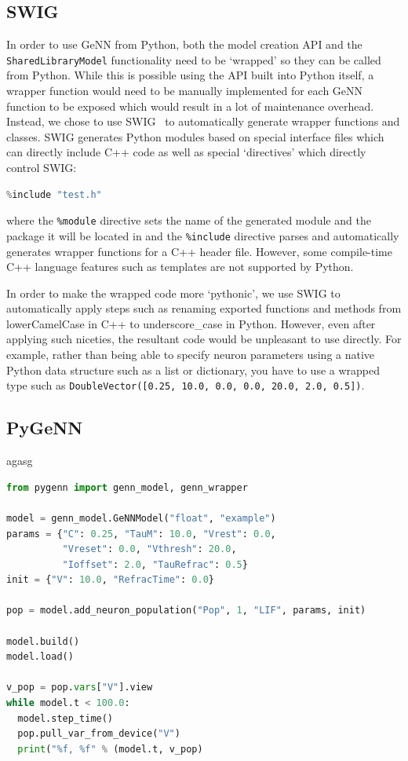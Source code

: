 \documentclass[utf8]{frontiersSCNS} %
\begin{document}
\subsection{SWIG}
In order to use GeNN from Python, both the model creation API and the \lstinline{SharedLibraryModel} functionality need to be `wrapped' so they can be called from Python.
While this is possible using the API built into Python itself, a wrapper function would need to be manually implemented for each GeNN function to be exposed which would result in a lot of maintenance overhead.
Instead, we chose to use SWIG~\citep{Beazley1996} to automatically generate wrapper functions and classes. 
SWIG generates Python modules based on special interface files which can directly include C++ code as well as special `directives' which directly control SWIG:
%
\begin{lstlisting}[language=C++]
%module(package="package") package
%include "test.h" 
\end{lstlisting}
%
where the \lstinline{%module} directive sets the name of the generated module and the package it will be located in and the \lstinline{%include} directive parses and automatically generates wrapper functions for a C++ header file.
However, some compile-time C++ language features such as templates are not supported by Python.

In order to make the wrapped code more `pythonic', we use SWIG to automatically apply steps such as renaming exported functions and methods from lowerCamelCase in C++ to underscore\_case in Python.
However, even after applying such niceties, the resultant code would be unpleasant to use directly.
For example, rather than being able to specify neuron parameters using a native Python data structure such as a list or dictionary, you have to use a wrapped type such as \lstinline{DoubleVector([0.25, 10.0, 0.0, 0.0, 20.0, 2.0, 0.5])}.


\subsection{PyGeNN}
agasg
\begin{lstlisting}[language=Python]
from pygenn import genn_model, genn_wrapper

model = genn_model.GeNNModel("float", "example")
params = {"C": 0.25, "TauM": 10.0, "Vrest": 0.0,
          "Vreset": 0.0, "Vthresh": 20.0,
          "Ioffset": 2.0, "TauRefrac": 0.5}
init = {"V": 10.0, "RefracTime": 0.0}

pop = model.add_neuron_population("Pop", 1, "LIF", params, init)

model.build()
model.load()

v_pop = pop.vars["V"].view
while model.t < 100.0:
  model.step_time()
  pop.pull_var_from_device("V")
  print("%f, %f" % (model.t, v_pop)
\end{lstlisting}
\end{document}
